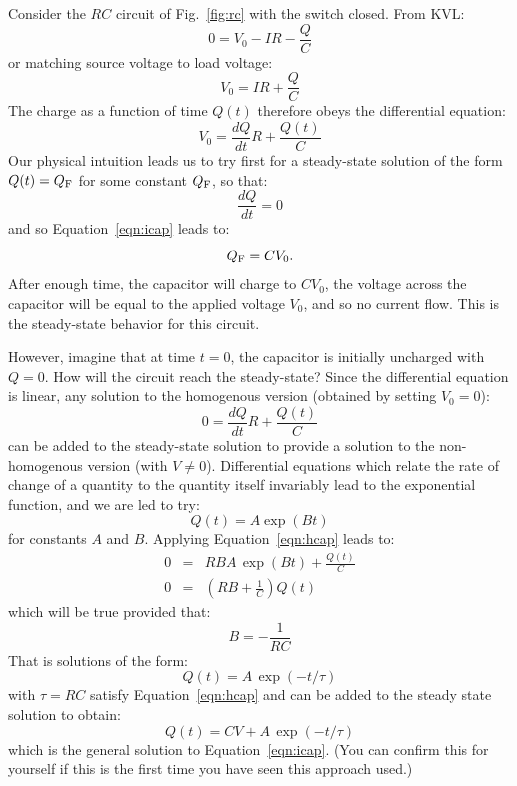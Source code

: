 \documentclass[12pt,oneside]{book}
\begin{document}
Consider the $RC$ circuit of Fig.~\ref{fig:rc} with the switch closed.  From KVL:
\begin{displaymath}
0 = V_0 - IR - \frac{Q}{C}
\end{displaymath}
or matching source voltage to load voltage:
\begin{displaymath}
V_0 = IR + \frac{Q}{C}
\end{displaymath}
The charge as a function of time $Q(t)$ therefore obeys the differential equation:
\begin{equation} \label{eqn:icap}
V_0 = \frac{dQ}{dt}R + \frac{Q(t)}{C}
\end{equation}
Our physical intuition leads us to try first for a steady-state solution of the form $Q(t) = Q_{\rm F}$ for some constant $Q_{\rm F}$, so that:
\begin{displaymath}
\frac{dQ}{dt} = 0
\end{displaymath}
and so Equation~\ref{eqn:icap} leads to:
\begin{displaymath}
Q_{\rm F} = C V_0.
\end{displaymath}
After enough time, the capacitor will charge to $CV_0$, the voltage across the capacitor will be equal to the applied voltage $V_0$, and so no current flow.  This is the steady-state behavior for this circuit.

However, imagine that at time $t=0$, the capacitor is initially uncharged with $Q=0$.  How will the circuit reach the steady-state?  Since the differential equation is linear, any solution to the homogenous version  (obtained by setting $V_0=0$):
\begin{equation} \label{eqn:hcap}
0 = \frac{dQ}{dt}R + \frac{Q(t)}{C}
\end{equation}
can be added to the steady-state solution to provide a solution to the non-homogenous version (with $V \ne 0$).  Differential equations which relate the rate of change of a quantity to the quantity itself invariably lead to the exponential function, and we are led to try:
\begin{displaymath}
Q(t) = A \exp(B t)
\end{displaymath}
for constants $A$ and $B$.  Applying Equation~\ref{eqn:hcap} leads to:
\begin{eqnarray*}
0 &=& R B A \, \exp(B t)  + \frac{Q(t)}{C}\\
0 &=& \left( RB + \frac{1}{C}\right) Q(t)
\end{eqnarray*}
which will be true provided that:
\begin{displaymath}
B = -\frac{1}{RC}
\end{displaymath}
That is solutions of the form:
\begin{displaymath}
Q(t) = A \, \exp(- t/\tau)
\end{displaymath}
with $\tau = RC$ satisfy Equation~\ref{eqn:hcap} and can be added to the steady state solution to obtain:
\begin{displaymath}
Q(t) = CV + A \, \exp(- t / \tau)
\end{displaymath}
which is the general solution to Equation~\ref{eqn:icap}.  (You can confirm this for yourself if this is the first time you have seen this approach used.)
\end{document}
